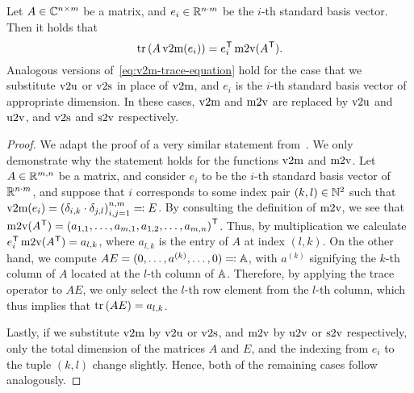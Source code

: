 \begin{lemma}\label{lem:v2m-function-trace}
    Let $A \in \mathbb{C}^{n \times m}$ be a matrix, and $e_i \in \mathbb{R}^{n \cdot m}$ be the $i$-th standard basis vector.
    Then it holds that
    \begin{equation}\label{eq:v2m-trace-equation}
        \mathop{}\!\mathrm{tr}\left(A \mathop{}\!\mathrm{v}2\mathrm{m}(e_i)\right) = e_i^{\mkern1mu \mathsf{T}} \mathop{}\!\mathrm{m}2\mathrm{v}(A^{\mkern1mu \mathsf{T}}).
    \end{equation}
    Analogous versions of~\eqref{eq:v2m-trace-equation} hold for the case that we substitute $\mathop{}\!\mathrm{v}2\mathrm{u}$ or $\mathop{}\!\mathrm{v}2\mathrm{s}$ in place of $\mathop{}\!\mathrm{v}2\mathrm{m}$, and $e_i$ is the $i$-th standard basis vector of appropriate dimension.
    In these cases, $\mathop{}\!\mathrm{v}2\mathrm{m}$ and $\mathop{}\!\mathrm{m}2\mathrm{v}$ are replaced by $\mathop{}\!\mathrm{v}2\mathrm{u}$ and $\mathop{}\!\mathrm{u}2\mathrm{v}$, and $\mathop{}\!\mathrm{v}2\mathrm{s}$ and $\mathop{}\!\mathrm{s}2\mathrm{v}$ respectively.
\end{lemma}

\begin{proof}
    We adapt the proof of a very similar statement from~\cite[Lemma~3.4]{SV2023}.
    We only demonstrate why the statement holds for the functions $\mathop{}\!\mathrm{v}2\mathrm{m}$ and $\mathop{}\!\mathrm{m}2\mathrm{v}$.
    Let $A \in \mathbb{R}^{m, n}$ be a matrix, and consider $e_i$ to be the $i$-th standard basis vector of $\mathbb{R}^{n \cdot m}$, and suppose that $i$ corresponds to some index pair $(k, l) \in \mathbb{N}^2$ such that $\mathop{}\!\mathrm{v}2\mathrm{m}(e_i) = {(\delta_{i, k} \cdot \delta_{j, l})}_{i, j = 1}^{n, m} \eqqcolon E$.
    By consulting the definition of $\mathop{}\!\mathrm{m}2\mathrm{v}$, we see that $\mathop{}\!\mathrm{m}2\mathrm{v}(A^{\mkern1mu \mathsf{T}}) = {(a_{1, 1}, \dots, a_{m, 1}, a_{1, 2}, \dots, a_{m, n})}^{\mkern1mu \mathsf{T}}$.
    Thus, by multiplication we calculate $e_i^{\mkern1mu \mathsf{T}} \mathop{}\!\mathrm{m}2\mathrm{v}(A^{\mkern1mu \mathsf{T}}) = a_{l, k}$, where $a_{l, k}$ is the entry of $A$ at index $(l, k)$.
    On the other hand, we compute $A E = (0, \dots, a^{(k)}, \dots, 0) \eqqcolon \mathbb{A}$, with $a^{(k)}$ signifying the $k$-th column of $A$ located at the $l$-th column of $\mathbb{A}$.
    Therefore, by applying the trace operator to $A E$, we only select the $l$-th row element from the $l$-th column, which thus implies that $\mathop{}\!\mathrm{tr}\left(A E\right) = a_{l, k}$.

    Lastly, if we substitute $\mathop{}\!\mathrm{v}2\mathrm{m}$ by $\mathop{}\!\mathrm{v}2\mathrm{u}$ or $\mathop{}\!\mathrm{v}2\mathrm{s}$, and $\mathop{}\!\mathrm{m}2\mathrm{v}$ by $\mathop{}\!\mathrm{u}2\mathrm{v}$ or $\mathop{}\!\mathrm{s}2\mathrm{v}$ respectively, only the total dimension of the matrices $A$ and $E$, and the indexing from $e_i$ to the tuple $(k, l)$ change slightly.
    Hence, both of the remaining cases follow analogously.
\end{proof}

